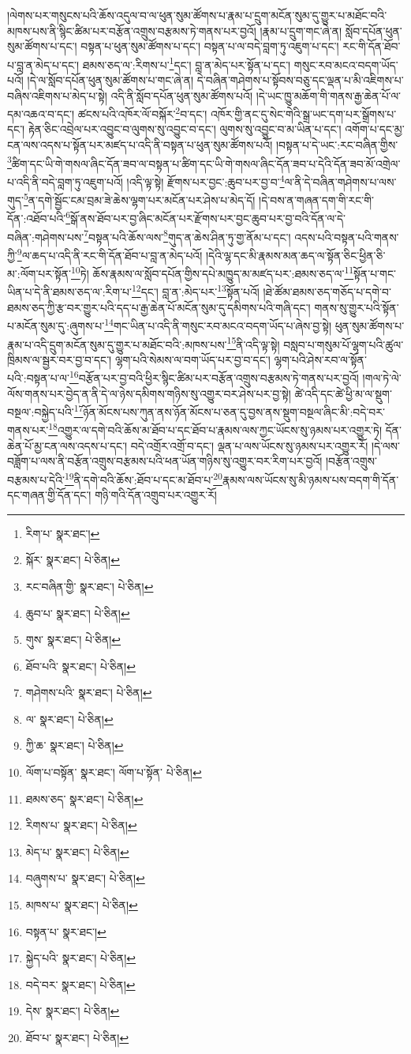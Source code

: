 །ལེགས་པར་གསུངས་པའི་ཆོས་འདུལ་བ་ལ་ཕུན་སུམ་ཚོགས་པ་རྣམ་པ་དྲུག་མངོན་སུམ་དུ་གྱུར་པ་མཐོང་བའི་མཁས་པས་ནི་སྙིང་ཚིམ་པར་བརྩོན་འགྲུས་བརྩམས་ཏེ་གནས་པར་བྱའོ། །རྣམ་པ་དྲུག་གང་ཞེ་ན། སློབ་དཔོན་ཕུན་སུམ་ཚོགས་པ་དང་། བསྟན་པ་ཕུན་སུམ་ཚོགས་པ་དང་། བསྟན་པ་ལ་བདེ་བླག་ཏུ་འཇུག་པ་དང་། རང་གི་དོན་ཐོབ་པ་བླ་ན་མེད་པ་དང་། ཐམས་ཅད་ལ་:རིགས་པ་\footnote{རིག་པ་  སྣར་ཐང་། }དང་། བླ་ན་མེད་པར་སྟོན་པ་དང་། གསུང་རབ་མངའ་བདག་ཡོད་པའོ། །དེ་ལ་སློབ་དཔོན་ཕུན་སུམ་ཚོགས་པ་གང་ཞེ་ན། དེ་བཞིན་གཤེགས་པ་སྟོབས་བཅུ་དང་ལྡན་པ་མི་འཇིགས་པ་བཞིས་འཇིགས་པ་མེད་པ་སྟེ། འདི་ནི་སློབ་དཔོན་ཕུན་སུམ་ཚོགས་པའོ། །དེ་ཡང་ཁྱུ་མཆོག་གི་གནས་རྒྱ་ཆེན་པོ་ལ་དམ་འཆའ་བ་དང་། ཚངས་པའི་འཁོར་ལོ་བསྐོར་\footnote{སྐོར་  སྣར་ཐང་།  པེ་ཅིན། }བ་དང་། འཁོར་གྱི་ནང་དུ་སེང་གེའི་སྒྲ་ཡང་དག་པར་སྒྲོགས་པ་དང་། རྟེན་ཅིང་འབྲེལ་པར་འབྱུང་བ་ལུགས་སུ་འབྱུང་བ་དང་། ལུགས་སུ་འབྱུང་བ་མ་ཡིན་པ་དང་། འགོག་པ་དང་མྱ་ངན་ལས་འདས་པ་སྟོན་པར་མཛད་པ་འདི་ནི་བསྟན་པ་ཕུན་སུམ་ཚོགས་པའོ། །བསྟན་པ་དེ་ཡང་:རང་བཞིན་གྱིས་\footnote{རང་བཞིན་གྱི་  སྣར་ཐང་།  པེ་ཅིན། }ཚིག་དང་ཡི་གེ་གསལ་ཞིང་དོན་ཟབ་ལ་བསྟན་པ་ཚིག་དང་ཡི་གེ་གསལ་ཞིང་དོན་ཟབ་པ་དེའི་དོན་ཟབ་མོ་འགྲེལ་པ་འདི་ནི་བདེ་བླག་ཏུ་འཇུག་པའོ། །འདི་ལྟ་སྟེ། རྫོགས་པར་བྱང་:ཆུབ་པར་བྱ་བ་\footnote{ཆུབ་པ་  སྣར་ཐང་།  པེ་ཅིན། }ལ་ནི་དེ་བཞིན་གཤེགས་པ་ལས་གུད་\footnote{གུས་  སྣར་ཐང་།  པེ་ཅིན། }ན་དགེ་སྦྱོང་ངམ་བྲམ་ཟེ་ཆེས་ལྷག་པར་མངོན་པར་ཤེས་པ་མེད་དོ། །དེ་བས་ན་གཞན་དག་གི་རང་གི་དོན་:འཐོབ་པའི་\footnote{ཐོབ་པའི་  སྣར་ཐང་།  པེ་ཅིན། }སྒོ་ནས་ཐོབ་པར་བྱ་ཞིང་མངོན་པར་རྫོགས་པར་བྱང་ཆུབ་པར་བྱ་བའི་དོན་ལ་དེ་བཞིན་:གཤེགས་པས་\footnote{གཤེགས་པའི་  སྣར་ཐང་།  པེ་ཅིན། }བསྟན་པའི་ཆོས་ལས་\footnote{ལ་  སྣར་ཐང་།  པེ་ཅིན། }གུད་ན་ཆེས་ཤིན་ཏུ་གྱ་ནོམ་པ་དང་། འདས་པའི་བསྟན་པའི་གནས་ཀྱི་\footnote{ཀྱི་ཆ་  སྣར་ཐང་།  པེ་ཅིན། }ལ་ཆད་པ་འདི་ནི་རང་གི་དོན་ཐོབ་པ་བླ་ན་མེད་པའོ། །དེའི་ལྷ་དང་མི་རྣམས་མན་ཆད་ལ་སྟོན་ཅིང་ཕྱིན་ཅི་མ་:ལོག་པར་སྟོན་\footnote{ལོག་པ་བསྟོན་  སྣར་ཐང་། ལོག་པ་སྟོན་  པེ་ཅིན། }ཏེ། ཆོས་རྣམས་ལ་སློབ་དཔོན་གྱིས་དཔེ་མཁྱུད་མ་མཛད་པར་:ཐམས་ཅད་ལ་\footnote{ཐམས་ཅད་  སྣར་ཐང་།  པེ་ཅིན། }སྟོན་པ་གང་ཡིན་པ་དེ་ནི་ཐམས་ཅད་ལ་:རིག་པ་\footnote{རིགས་པ་  སྣར་ཐང་།  པེ་ཅིན། }དང་། བླ་ན་:མེད་པར་\footnote{མེད་པ་  སྣར་ཐང་།  པེ་ཅིན། }སྟོན་པའོ། །ཐེ་ཚོམ་ཐམས་ཅད་གཅོད་པ་དགེ་བ་ཐམས་ཅད་ཀྱི་རྩ་བར་གྱུར་པའི་དད་པ་རྒྱ་ཆེན་པོ་མངོན་སུམ་དུ་དམིགས་པའི་གཞི་དང་། གནས་སུ་གྱུར་པའི་སྟོན་པ་མངོན་སུམ་དུ་:ཞུགས་པ་\footnote{བཞུགས་པ་  སྣར་ཐང་།  པེ་ཅིན། }གང་ཡིན་པ་འདི་ནི་གསུང་རབ་མངའ་བདག་ཡོད་པ་ཞེས་བྱ་སྟེ། ཕུན་སུམ་ཚོགས་པ་རྣམ་པ་འདི་དྲུག་མངོན་སུམ་དུ་གྱུར་པ་མཐོང་བའི་:མཁས་པས་\footnote{མཁས་པ་  སྣར་ཐང་།  པེ་ཅིན། }ནི་འདི་ལྟ་སྟེ། བསླབ་པ་གསུམ་པོ་ལྷག་པའི་ཚུལ་ཁྲིམས་ལ་སྦྱར་བར་བྱ་བ་དང་། ལྷག་པའི་སེམས་ལ་བག་ཡོད་པར་བྱ་བ་དང་། ལྷག་པའི་ཤེས་རབ་ལ་སྟོན་པའི་:བསྟན་པ་ལ་\footnote{བསྟན་པ་  སྣར་ཐང་། }བརྩོན་པར་བྱ་བའི་ཕྱིར་སྙིང་ཚིམ་པར་བརྩོན་འགྲུས་བརྩམས་ཏེ་གནས་པར་བྱའོ། །གལ་ཏེ་ལེ་ལོས་གནས་པར་བྱེད་ན་ནི་དེ་ལ་ཉེས་དམིགས་གཉིས་སུ་འགྱུར་བར་ཤེས་པར་བྱ་སྟེ། ཚེ་འདི་དང་ཚེ་ཕྱི་མ་ལ་སྡུག་བསྔལ་:བསྐྱེད་པའི་\footnote{སྐྱེད་པའི་  སྣར་ཐང་།  པེ་ཅིན། }ཉོན་མོངས་པས་ཀུན་ནས་ཉོན་མོངས་པ་ཅན་དུ་བྱས་ནས་སྡུག་བསྔལ་ཞིང་མི་:བདེ་བར་གནས་པར་\footnote{བདེ་བར་  སྣར་ཐང་།  པེ་ཅིན། }འགྱུར་ལ་དགེ་བའི་ཆོས་མ་ཐོབ་པ་དང་ཐོབ་པ་རྣམས་ལས་ཀྱང་ཡོངས་སུ་ཉམས་པར་འགྱུར་ཏེ། དོན་ཆེན་པོ་མྱ་ངན་ལས་འདས་པ་དང་། བདེ་འགྲོར་འགྲོ་བ་དང་། ལྡན་པ་ལས་ཡོངས་སུ་ཉམས་པར་འགྱུར་རོ། །དེ་ལས་བཟློག་པ་ལས་ནི་བརྩོན་འགྲུས་བརྩམས་པའི་ཕན་ཡོན་གཉིས་སུ་འགྱུར་བར་རིག་པར་བྱའོ། །བརྩོན་འགྲུས་བརྩམས་པ་དེའི་\footnote{དེས་  སྣར་ཐང་།  པེ་ཅིན། }ནི་དགེ་བའི་ཆོས་:ཐོབ་པ་དང་མ་ཐོབ་པ་\footnote{ཐོབ་པ་  སྣར་ཐང་།  པེ་ཅིན། }རྣམས་ལས་ཡོངས་སུ་མི་ཉམས་པས་བདག་གི་དོན་དང་གཞན་གྱི་དོན་དང་། གཉི་གའི་དོན་འགྲུབ་པར་འགྱུར་རོ། 